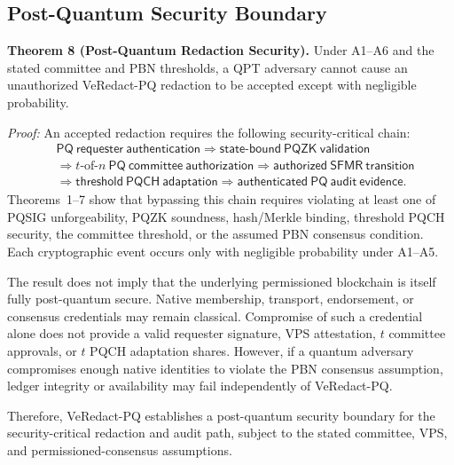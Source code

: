 \documentclass[lettersize,journal]{IEEEtran}
\begin{document}
\subsection{Post-Quantum Security Boundary}

\textbf{Theorem 8 (Post-Quantum Redaction Security).}
Under A1--A6 and the stated committee and PBN thresholds, a QPT
adversary cannot cause an unauthorized VeRedact-PQ redaction to be
accepted except with negligible probability.

\emph{Proof:}
An accepted redaction requires the following security-critical chain:
\begin{equation}
\begin{split}
&\mathsf{PQ\ requester\ authentication}
\Rightarrow
\mathsf{state\mbox{-}bound\ PQZK\ validation}\\
&\Rightarrow
t\text{-of-}n\ \mathsf{PQ\ committee\ authorization}
\Rightarrow
\mathsf{authorized\ SFMR\ transition}\\
&\Rightarrow
\mathsf{threshold\ PQCH\ adaptation}
\Rightarrow
\mathsf{authenticated\ PQ\ audit\ evidence}.
\end{split}
\label{eq:sec_pq_chain}
\end{equation}
Theorems~1--7 show that bypassing this chain requires violating at
least one of PQSIG unforgeability, PQZK soundness, hash/Merkle binding,
threshold PQCH security, the committee threshold, or the assumed PBN
consensus condition. Each cryptographic event occurs only with
negligible probability under A1--A5.

The result does not imply that the underlying permissioned blockchain
is itself fully post-quantum secure. Native membership, transport,
endorsement, or consensus credentials may remain classical. Compromise
of such a credential alone does not provide a valid requester
signature, VPS attestation, $t$ committee approvals, or $t$ PQCH
adaptation shares. However, if a quantum adversary compromises enough
native identities to violate the PBN consensus assumption, ledger
integrity or availability may fail independently of VeRedact-PQ.

Therefore, VeRedact-PQ establishes a post-quantum security boundary for
the security-critical redaction and audit path, subject to the stated
committee, VPS, and permissioned-consensus assumptions.

    
    
\end{document}
